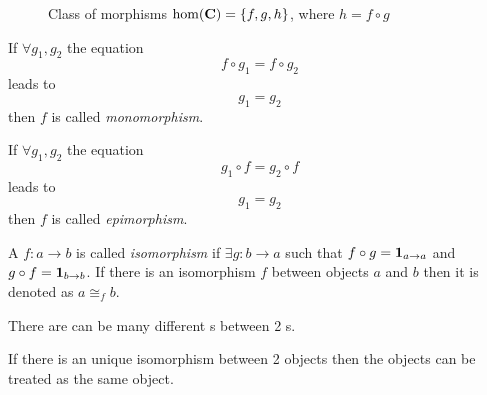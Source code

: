 \begin{figure}
  \centering
  \caption{Class of morphisms $\mathrm{hom}(\mathbf{C})=\{f,g,h\}$, where $h = f
    \circ g$}
  \label{fig:class_of_morphisms}
\end{figure}


\begin{definition}[Monomorphism]
  \label{def:monomorphism}
  If $\forall g_1, g_2$ the equation 
  \[
  f \circ g_1 = f \circ g_2
  \]
  leads to 
  \[
  g_1 = g_2
  \]
  then $f$ is called \textit{monomorphism}.
\end{definition}

\begin{definition}[Epimorphism]
  \label{def:epimorphism}
  If $\forall g_1, g_2$ the equation 
  \[
  g_1 \circ f = g_2 \circ f
  \]
  leads to 
  \[
  g_1 = g_2
  \]
  then $f$ is called \textit{epimorphism}.
\end{definition}

\begin{definition}[Isomorphism]
\label{def:isomorphism} 
A  $f: a \to b$ is called \textit{isomorphism} if
$\exists g: b \to a$ such that $f \circ g = \mathbf{1}_{ a \to a }$ 
and $g \circ f = \mathbf{1}_{ b \to b }$.  
If there is an isomorphism $f$ between objects $a$ and $b$
then it is denoted as $a \cong_f b$. 
\end{definition}

\begin{remark}[Isomorphism]
\label{rem:isomorphism}
There are can be many different s between 2
s. 

If there is an unique isomorphism between 2 objects then the objects
can be treated as the same object.
\end{remark}

